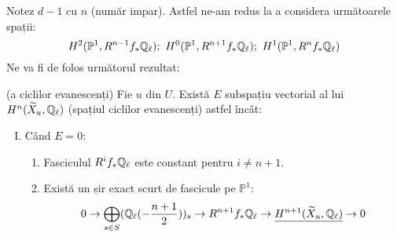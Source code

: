 \documentclass[13pt,openany,oneside]{book}
\begin{document}
Notez $d-1$ cu $n$ (număr impar). Astfel ne-am redus la a considera următoarele spații:
$$H^2(\mathbb{P}^1,R^{n-1} f_* \Qell);\ H^0(\mathbb{P}^1,R^{n+1} f_* \Qell);\ H^1(\mathbb{P}^1,R^n f_* \Qell)$$
Ne va fi de folos următorul rezultat:

\begin{teo}
(a ciclilor evanescenți) Fie $u$ din $U$. Există $E$ subspațiu vectorial al lui $H^n(\widetilde{X}_u,\mathbb{Q}_\ell)$ (spațiul ciclilor evanescenți) astfel încât:
\begin{enumerate}[I.]
\item Când $E=0$:
\begin{enumerate}[1.]
\item Fasciculul $R^i f_* \mathbb{Q}_\ell$ este constant pentru $i\neq n+1$.
\item Există un șir exact scurt de fascicule pe $\mathbb{P}^1$:
$$0 \rightarrow \bigoplus\limits_{s\in S} (\mathbb{Q}_\ell(-\frac{n+1}{2}))_s \rightarrow R^{n+1}f_*\mathbb{Q}_\ell \rightarrow \underline{H^{n+1}(\widetilde{X}_u,\mathbb{Q}_\ell)} \rightarrow 0$$
\end{enumerate}


\end{enumerate}
\end{teo}
\end{document}
